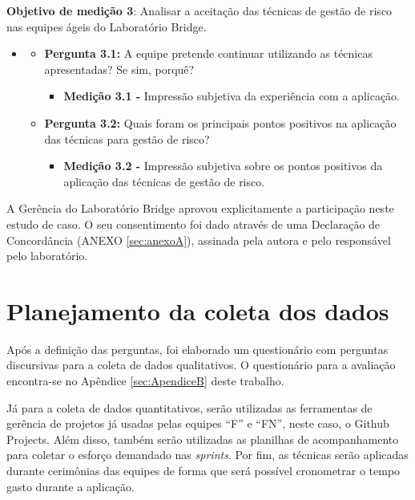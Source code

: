 \documentclass[
    12pt,       %
    openright,      %
    twoside,      %
    a4paper,      %
    english,      %
    french,       %
    spanish,      %
    brazil,       %
    ]{abntex2}
\begin{document}
\textbf{Objetivo de medição 3}: Analisar a aceitação das técnicas de gestão de risco nas equipes ágeis do Laboratório Bridge.

\begin{itemize}[label={}]
\item
\begin{itemize}
        \item \textbf{Pergunta 3.1:} A equipe pretende continuar utilizando as técnicas apresentadas? Se sim, porquê?
            \begin{itemize}[label={}]
                \item \textbf{Medição 3.1 - } Impressão subjetiva da experiência com a aplicação.
            \end{itemize}
        \item \textbf{Pergunta 3.2:} Quais foram os principais pontos positivos na aplicação das técnicas para gestão de risco?
            \begin{itemize}[label={}]
                \item \textbf{Medição 3.2 - } Impressão subjetiva sobre os pontos positivos da aplicação das técnicas de gestão de risco.
            \end{itemize}    
\end{itemize}
\end{itemize} 


A Gerência do Laboratório Bridge aprovou explicitamente a participação neste estudo de caso. O seu consentimento foi dado através de uma Declaração de Concordância (ANEXO \ref{sec:anexoA}), assinada pela autora e pelo responsável pelo laboratório.

\section{Planejamento da coleta dos dados}

Após a definição das perguntas, foi elaborado um questionário com perguntas discursivas para a coleta de dados qualitativos. O questionário para a avaliação encontra-se no Apêndice \ref{sec:ApendiceB} deste trabalho.

Já para a coleta de dados quantitativos, serão utilizadas as ferramentas de gerência de projetos já usadas pelas equipes ``F'' e ``FN'', neste caso, o Github Projects. Além disso, também serão utilizadas as planilhas de acompanhamento para coletar o esforço demandado nas \textit{sprints}. Por fim, as técnicas serão aplicadas durante cerimônias das equipes de forma que será possível cronometrar o tempo gasto durante a aplicação. 
\end{document}
